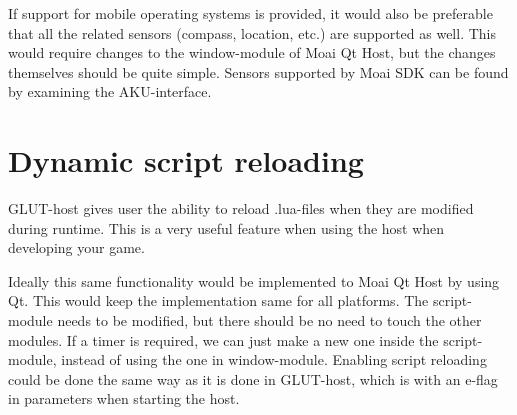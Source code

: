 If support for mobile operating systems is provided, it would also be preferable that all the related sensors (compass, location, etc.) are supported as well.
This would require changes to the window-module of Moai Qt Host, but the changes themselves should be quite simple.
Sensors supported by Moai SDK can be found by examining the AKU-interface.

\section{Dynamic script reloading}

GLUT-host gives user the ability to reload .lua-files when they are modified during runtime.
This is a very useful feature when using the host when developing your game.

Ideally this same functionality would be implemented to Moai Qt Host by using Qt. This would keep the implementation same for all platforms. 
The script-module needs to be modified, but there should be no need to touch the other modules. 
If a timer is required, we can just make a new one inside the script-module, instead of using the one in window-module.
Enabling script reloading could be done the same way as it is done in GLUT-host, which is with an e-flag in parameters when starting the host.
